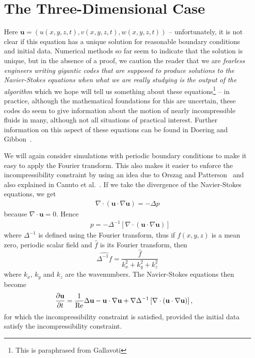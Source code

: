 \section{The Three-Dimensional Case}

Here $\mathbf u = (u(x,y,z,t),v(x,y,z,t),w(x,y,z,t))$ -- unfortunately, it is not clear if this equation has a unique solution for reasonable boundary conditions and initial data. Numerical methods so far seem to indicate that the solution is unique, but in the absence of a proof, we caution the reader that we are {\it fearless engineers writing gigantic codes that are supposed to produce solutions to the Navier-Stokes equations when what we are really studying is the output of the algorithm} which we hope will tell us something about these equations\footnote{This is paraphrased from Gallavoti\cite[p.~VIII]{Gal02}} -- in practice, although the mathematical foundations for this are uncertain, these codes do seem to give information about the motion of nearly incompressible fluids in many, although not all situations of practical interest. Further information on this aspect of these equations can be found in Doering and Gibbon~\cite{DoeGib95}.

We will again consider simulations with periodic boundary conditions to make it easy to apply the Fourier transform. This also makes it easier to enforce the incompressibility constraint by using an idea due to Orszag and Patterson~\cite{OrsPat72} and also explained in Canuto et al.~\cite[p.~99]{CHQZ07}. If we take the divergence of the Navier-Stokes equations, we get
\begin{align}
\nabla\cdot \left(\mathbf u\cdot\nabla\mathbf u\right)=-\Delta p
\end{align}
because $\nabla\cdot\mathbf u=0$. Hence
\begin{align}
&{}p=-\Delta^{-1}\left[\nabla\cdot \left(\mathbf u\cdot\nabla\mathbf u\right)\right] 
\end{align}
where $\Delta^{-1}$ is defined using the Fourier transform, thus if $f(x,y,z)$ is a mean zero, periodic scalar field and $\hat{f}$ is its Fourier transform, then
$$\widehat{\Delta^{-1}f}=\frac{\hat{f}}{k_x^2+k_y^2+k_z^2}$$
where $k_x$, $k_y$ and $k_z$ are the wavenumbers. The Navier-Stokes equations then become
\begin{align}
&{}\frac{\partial \mathbf u}{\partial t}=\frac{1}{\textup{Re}}\Delta \mathbf u - \mathbf u\cdot\nabla\mathbf u +\nabla \Delta^{-1}\left[\nabla\cdot \left(\mathbf u\cdot\nabla\mathbf u\right)\right], \label{eq:NS3dOrsPat}
\end{align}
for which the incompressibility constraint is satisfied, provided the initial data satisfy the incompressibility constraint. 

